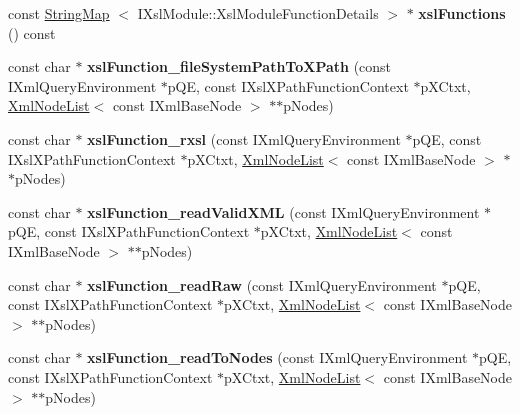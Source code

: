 \begin{DoxyCompactItemize}
\item 
\hypertarget{classgeneral__server_1_1Repository_ad097e4af9f6a6b5adaf031a25ac431b9}{const \hyperlink{classgeneral__server_1_1StringMap}{\-String\-Map}\*
$<$ \-I\-Xsl\-Module\-::\-Xsl\-Module\-Function\-Details $>$ $\ast$ {\bfseries xsl\-Functions} () const }\label{classgeneral__server_1_1Repository_ad097e4af9f6a6b5adaf031a25ac431b9}

\item 
\hypertarget{group__XSLModule-Functions_gaffd1f822af85c5fc69654c77c2e5f6e2}{const char $\ast$ {\bfseries xsl\-Function\-\_\-file\-System\-Path\-To\-X\-Path} (const \-I\-Xml\-Query\-Environment $\ast$p\-Q\-E, const \-I\-Xsl\-X\-Path\-Function\-Context $\ast$p\-X\-Ctxt, \hyperlink{classgeneral__server_1_1XmlNodeList}{\-Xml\-Node\-List}$<$ const \-I\-Xml\-Base\-Node $>$ $\ast$$\ast$p\-Nodes)}\label{group__XSLModule-Functions_gaffd1f822af85c5fc69654c77c2e5f6e2}

\item 
\hypertarget{group__XSLModule-Functions_ga6fd492a595c2190d2cdcc15d73600678}{const char $\ast$ {\bfseries xsl\-Function\-\_\-rxsl} (const \-I\-Xml\-Query\-Environment $\ast$p\-Q\-E, const \-I\-Xsl\-X\-Path\-Function\-Context $\ast$p\-X\-Ctxt, \hyperlink{classgeneral__server_1_1XmlNodeList}{\-Xml\-Node\-List}$<$ const \-I\-Xml\-Base\-Node $>$ $\ast$$\ast$p\-Nodes)}\label{group__XSLModule-Functions_ga6fd492a595c2190d2cdcc15d73600678}

\item 
\hypertarget{group__XSLModule-Functions_gaf94e10af29ce6c16f9edf8037bdca2f9}{const char $\ast$ {\bfseries xsl\-Function\-\_\-read\-Valid\-X\-M\-L} (const \-I\-Xml\-Query\-Environment $\ast$p\-Q\-E, const \-I\-Xsl\-X\-Path\-Function\-Context $\ast$p\-X\-Ctxt, \hyperlink{classgeneral__server_1_1XmlNodeList}{\-Xml\-Node\-List}$<$ const \-I\-Xml\-Base\-Node $>$ $\ast$$\ast$p\-Nodes)}\label{group__XSLModule-Functions_gaf94e10af29ce6c16f9edf8037bdca2f9}

\item 
\hypertarget{group__XSLModule-Functions_ga02b0c10bfdb3cbe469a9b5838d6460e3}{const char $\ast$ {\bfseries xsl\-Function\-\_\-read\-Raw} (const \-I\-Xml\-Query\-Environment $\ast$p\-Q\-E, const \-I\-Xsl\-X\-Path\-Function\-Context $\ast$p\-X\-Ctxt, \hyperlink{classgeneral__server_1_1XmlNodeList}{\-Xml\-Node\-List}$<$ const \-I\-Xml\-Base\-Node $>$ $\ast$$\ast$p\-Nodes)}\label{group__XSLModule-Functions_ga02b0c10bfdb3cbe469a9b5838d6460e3}

\item 
\hypertarget{group__XSLModule-Functions_gab3913f2a4a226b2569fefe7cb8309639}{const char $\ast$ {\bfseries xsl\-Function\-\_\-read\-To\-Nodes} (const \-I\-Xml\-Query\-Environment $\ast$p\-Q\-E, const \-I\-Xsl\-X\-Path\-Function\-Context $\ast$p\-X\-Ctxt, \hyperlink{classgeneral__server_1_1XmlNodeList}{\-Xml\-Node\-List}$<$ const \-I\-Xml\-Base\-Node $>$ $\ast$$\ast$p\-Nodes)}\label{group__XSLModule-Functions_gab3913f2a4a226b2569fefe7cb8309639}


\end{DoxyCompactItemize}
